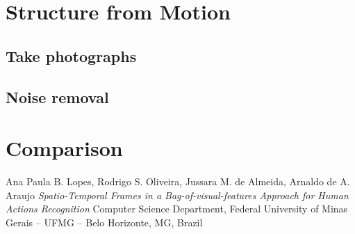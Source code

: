 \documentclass[]{article}
\begin{document}
\section{Structure from Motion}

\subsection{Take photographs}

\subsection{Noise removal}


\section{Comparison}




\begin{thebibliography}{1}

   Ana Paula B. Lopes, Rodrigo S. Oliveira, Jussara M. de Almeida, Arnaldo de A. Araujo {\em Spatio-Temporal Frames in a Bag-of-visual-features Approach for Human Actions Recognition} Computer Science Department, Federal University of Minas Gerais – UFMG – Belo Horizonte, MG, Brazil
\end{thebibliography}        

		
\end{document}

